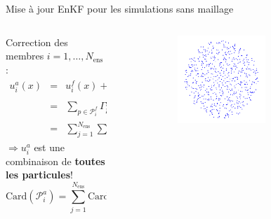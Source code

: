 \documentclass[aspectratio=169]{beamer} %
\begin{document}
\begin{frame}{Mise à jour EnKF pour les simulations sans maillage}
    \begin{columns}[t]
        \begin{column}{0.7\textwidth}
            Correction des membres $i = 1, \dots, N_{\text{ens}}$ : \\
            \vspace{-0.50cm}
            \begin{eqnarray*}
                u_i^a(x) &=& u^f_i(x) + \sum_{j=1}^{N_{\text{ens}}} F_{ij}~u^f_j(x), \\
                &=& \sum_{p \in \mathcal{P}^f_i} \Gamma^f_p \phi_h(x - x_p) + \sum_{j=1}^{N_{\text{ens}}} F_{ij} \sum_{{p'} \in \mathcal{P}_j^f} \Gamma^f_{p'} \phi_h(x - x_{p'}), \\
                &=& \sum_{j=1}^{N_{\text{ens}}} \sum_{ p \in \mathcal{P}^f_i} \Gamma^a_p \phi_h (x - x_p)
            \end{eqnarray*}
            \vspace{-0.10cm}
            $\Rightarrow u_i^a$ est une combinaison de \textbf{toutes les particules}! \\
            \vspace{-0.10cm}
            \begin{equation*}
                \text{Card}(\mathcal P^a_i) = \sum_{j=1}^{N_{\text{ens}}}\text{Card}(\mathcal P^f_j)
            \end{equation*}
        \end{column}
        \begin{column}{0.3\textwidth}
            \vspace{-1cm}
            \begin{figure}
                \centering
                \begin{subfigure}{\textwidth}
                    \centering
                    \includegraphics[width=0.7\textwidth]{../../conference/images/memb_particles.pdf}

\end{subfigure}
\end{figure}
\end{column}
\end{columns}
\end{frame}
\end{document}
